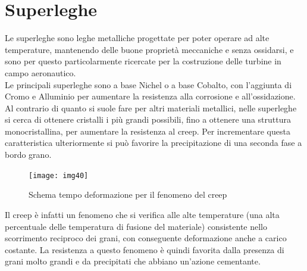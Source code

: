 \section{Superleghe}
Le superleghe sono leghe metalliche progettate per poter operare ad alte temperature, mantenendo delle buone proprietà meccaniche e senza ossidarsi, e sono per questo particolarmente ricercate per la costruzione delle turbine in campo aeronautico. \\
Le principali superleghe sono a base Nichel o a base Cobalto, con l'aggiunta di Cromo e Alluminio per aumentare la resistenza alla corrosione e all'ossidazione. Al contrario di quanto si suole fare per altri materiali metallici, nelle superleghe si cerca di ottenere cristalli i più grandi possibili, fino a ottenere una struttura monocristallina, per aumentare la resistenza al creep. Per incrementare questa caratteristica ulteriormente si può favorire la precipitazione di una seconda fase a bordo grano.
\begin{figure}[!hbt]
    \texttt{[image: img40]}
    \caption{Schema tempo deformazione per il fenomeno del creep}
\end{figure}
Il creep è infatti un fenomeno che si verifica alle alte temperature (una alta percentuale delle temperatura di fusione del materiale) consistente nello scorrimento reciproco dei grani, con conseguente deformazione anche a carico costante. La resistenza a questo fenomeno è quindi favorita dalla presenza di grani molto grandi e da precipitati che abbiano un'azione cementante.
